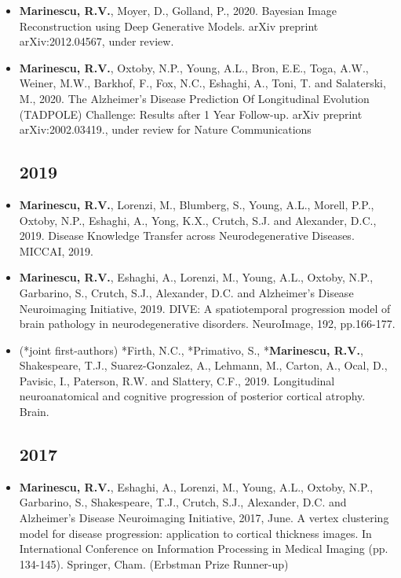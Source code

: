 \documentclass[a4paper,10pt]{article} %
\begin{document}
\newcommand{\poster}{\textcolor{red}{Poster}}
\newcommand{\talk}{\textcolor{darkgreen}{Oral}}
\newcommand{\journal}{\textcolor{blue}{Journal}}


\begin{itemize}
\subsection*{2020}
\item[Conference] \textbf{Marinescu, R.V.}, Moyer, D., Golland, P., 2020. Bayesian Image Reconstruction using Deep Generative Models. arXiv preprint arXiv:2012.04567, under review.
\item[\journal] \textbf{Marinescu, R.V.}, Oxtoby, N.P., Young, A.L., Bron, E.E., Toga, A.W., Weiner, M.W., Barkhof, F., Fox, N.C., Eshaghi, A., Toni, T. and Salaterski, M., 2020. The Alzheimer's Disease Prediction Of Longitudinal Evolution (TADPOLE) Challenge: Results after 1 Year Follow-up. arXiv preprint arXiv:2002.03419., under review for Nature Communications

\subsection*{2019}
\item[\poster] \textbf{Marinescu, R.V.}, Lorenzi, M., Blumberg, S., Young, A.L., Morell, P.P., Oxtoby, N.P., Eshaghi, A., Yong, K.X., Crutch, S.J. and Alexander, D.C., 2019. Disease Knowledge Transfer across Neurodegenerative Diseases. MICCAI, 2019.

\item[\journal] \textbf{Marinescu, R.V.}, Eshaghi, A., Lorenzi, M., Young, A.L., Oxtoby, N.P., Garbarino, S., Crutch, S.J., Alexander, D.C. and Alzheimer's Disease Neuroimaging Initiative, 2019. DIVE: A spatiotemporal progression model of brain pathology in neurodegenerative disorders. NeuroImage, 192, pp.166-177.

\item[\journal] (*joint first-authors) *Firth, N.C., *Primativo, S., *\textbf{Marinescu, R.V.}, Shakespeare, T.J., Suarez-Gonzalez, A., Lehmann, M., Carton, A., Ocal, D., Pavisic, I., Paterson, R.W. and Slattery, C.F., 2019. Longitudinal neuroanatomical and cognitive progression of posterior cortical atrophy. Brain.

\subsection*{2017}
\item[\talk] \textbf{Marinescu, R.V.}, Eshaghi, A., Lorenzi, M., Young, A.L., Oxtoby, N.P., Garbarino, S., Shakespeare, T.J., Crutch, S.J., Alexander, D.C. and Alzheimer’s Disease Neuroimaging Initiative, 2017, June. A vertex clustering model for disease progression: application to cortical thickness images. In International Conference on Information Processing in Medical Imaging (pp. 134-145). Springer, Cham. (Erbstman Prize Runner-up)



\end{itemize}
\end{document}
